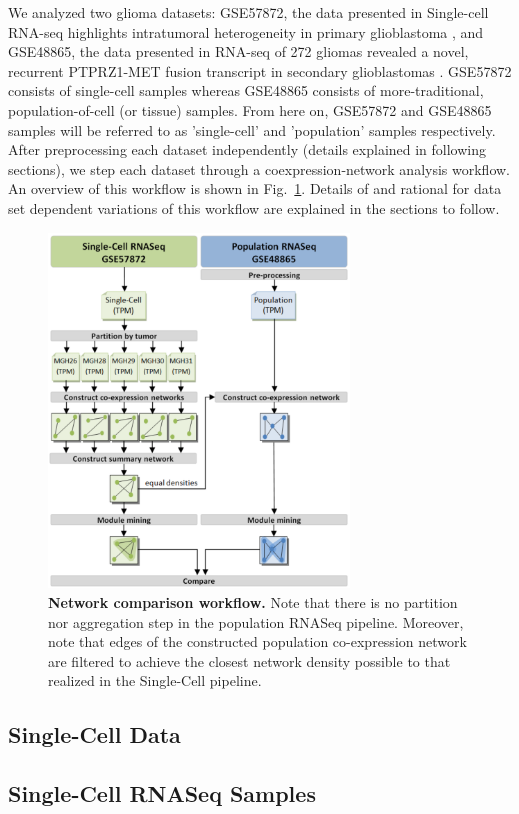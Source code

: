 \documentclass[10pt,letterpaper]{article}
\begin{document}
We analyzed two glioma datasets: GSE57872, the data presented in Single-cell RNA-seq highlights intratumoral heterogeneity in primary glioblastoma \cite{Patel20062014}, and GSE48865, the data presented in RNA-seq of 272 gliomas revealed a novel, recurrent PTPRZ1-MET fusion transcript in secondary glioblastomas \cite{Bao2014}. GSE57872 consists of single-cell samples whereas GSE48865 consists of more-traditional, population-of-cell (or tissue) samples. From here on, GSE57872 and GSE48865 samples will be referred to as 'single-cell' and 'population' samples respectively. After preprocessing each dataset independently (details explained in following sections), we step each dataset through a coexpression-network analysis workflow. An overview of this workflow is shown in Fig.~\ref{fig:workflow}. Details of and rational for data set dependent variations of this workflow are explained in the sections to follow.

\begin{figure}[h]
\centering
\includegraphics[width=80mm]{Figures/Workflow}
\caption{{\bf Network comparison workflow.} Note that there is no  partition nor aggregation step in the population RNASeq pipeline. Moreover, note that edges of the constructed population co-expression network are filtered to achieve the closest network density possible to that realized in the Single-Cell pipeline. }
\label{fig:workflow}
\end{figure}

\subsection*{Single-Cell Data}
\subsection*{Single-Cell RNASeq Samples }
\end{document}
